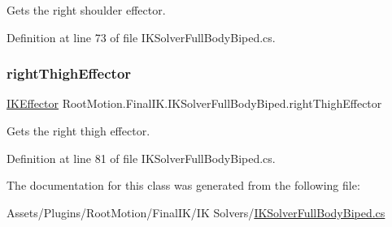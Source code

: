 Gets the right shoulder effector. 



Definition at line 73 of file I\+K\+Solver\+Full\+Body\+Biped.\+cs.

\mbox{\label{class_root_motion_1_1_final_i_k_1_1_i_k_solver_full_body_biped_a11b63ebb06b59132ee2988963de88088}} 
\subsubsection{\texorpdfstring{right\+Thigh\+Effector}{rightThighEffector}}
{\footnotesize\ttfamily \mbox{\hyperlink{class_root_motion_1_1_final_i_k_1_1_i_k_effector}{I\+K\+Effector}} Root\+Motion.\+Final\+I\+K.\+I\+K\+Solver\+Full\+Body\+Biped.\+right\+Thigh\+Effector\hspace{0.3cm}{\ttfamily [get]}}



Gets the right thigh effector. 



Definition at line 81 of file I\+K\+Solver\+Full\+Body\+Biped.\+cs.



The documentation for this class was generated from the following file\+:\begin{DoxyCompactItemize}
\item 
Assets/\+Plugins/\+Root\+Motion/\+Final\+I\+K/\+I\+K Solvers/\mbox{\hyperlink{_i_k_solver_full_body_biped_8cs}{I\+K\+Solver\+Full\+Body\+Biped.\+cs}}\end{DoxyCompactItemize}
